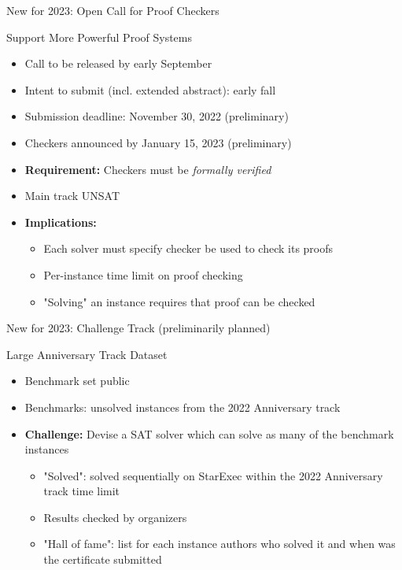 \documentclass{beamer}
\begin{document}
\begin{frame}{New for 2023: Open Call for Proof Checkers}
\begin{block}{Support More Powerful Proof Systems}
\begin{itemize}\setlength\itemsep{.5em}
\item Call to be released by early September
\item Intent to submit (incl. extended abstract): early fall
\item Submission deadline: November 30, 2022 (preliminary)
\item Checkers announced by January 15, 2023 (preliminary)
\item \textbf{Requirement:} Checkers must be \emph{formally verified}
\item Main track UNSAT
\item \textbf{Implications:}
\begin{itemize}
\item Each solver must specify checker  be used to check its proofs
\item Per-instance time limit on proof checking 
\item "Solving" an instance requires that  proof can be checked 
\end{itemize}
\end{itemize}
\end{block}
\end{frame}

\begin{frame}{New for 2023: Challenge Track (preliminarily planned)}
\begin{block}{Large Anniversary Track Dataset}
\begin{itemize}\setlength\itemsep{1em}
\item Benchmark set public 
\item Benchmarks: unsolved instances from the 2022 Anniversary track
\item \textbf{Challenge:} Devise a SAT solver which can solve as many of the benchmark instances
\begin{itemize}\setlength\itemsep{1em}
\item "Solved": solved sequentially on StarExec within the 2022 Anniversary track time limit
\item Results checked by organizers
\item "Hall of fame": list for each instance authors who solved it and when was the certificate submitted
\end{itemize}
\end{itemize}
\end{block}
\end{frame}
\end{document}
